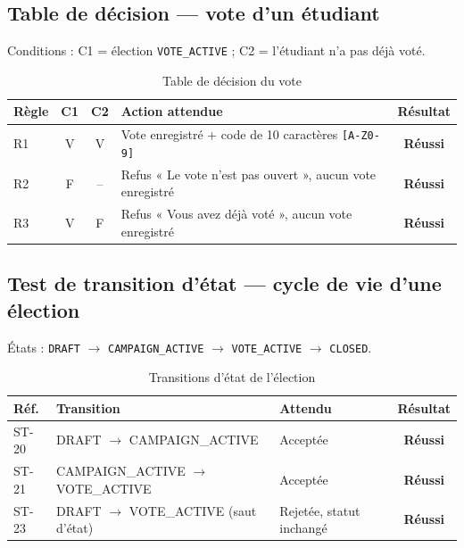 \documentclass[12pt,a4paper]{report}
\newcommand{\ok}{\textcolor{okgreen}{\textbf{Réussi}}}
\begin{document}
\subsection{Table de décision --- vote d'un étudiant}
Conditions : C1 = élection \texttt{VOTE\_ACTIVE} ; C2 = l'étudiant n'a pas déjà voté.
\begin{table}[H]
\centering
\caption{Table de décision du vote}
\small
\begin{tabular}{@{}lcclc@{}}
\toprule
\rowcolor{evlight}\textbf{Règle} & \textbf{C1} & \textbf{C2} & \textbf{Action attendue} & \textbf{Résultat}\\
\midrule
R1 & V & V & Vote enregistré + code de 10 caractères \texttt{[A-Z0-9]} & \ok\\
R2 & F & -- & Refus « Le vote n'est pas ouvert », aucun vote enregistré & \ok\\
R3 & V & F & Refus « Vous avez déjà voté », aucun vote enregistré & \ok\\
\bottomrule
\end{tabular}
\end{table}

\subsection{Test de transition d'état --- cycle de vie d'une élection}
États : \texttt{DRAFT} $\rightarrow$ \texttt{CAMPAIGN\_ACTIVE} $\rightarrow$ \texttt{VOTE\_ACTIVE} $\rightarrow$ \texttt{CLOSED}.
\begin{table}[H]
\centering
\caption{Transitions d'état de l'élection}
\small
\begin{tabular}{@{}lllc@{}}
\toprule
\rowcolor{evlight}\textbf{Réf.} & \textbf{Transition} & \textbf{Attendu} & \textbf{Résultat}\\
\midrule
ST-20 & DRAFT $\rightarrow$ CAMPAIGN\_ACTIVE & Acceptée & \ok\\
ST-21 & CAMPAIGN\_ACTIVE $\rightarrow$ VOTE\_ACTIVE & Acceptée & \ok\\
ST-23 & DRAFT $\rightarrow$ VOTE\_ACTIVE (saut d'état) & Rejetée, statut inchangé & \ok\\
\bottomrule
\end{tabular}
\end{table}
\end{document}
